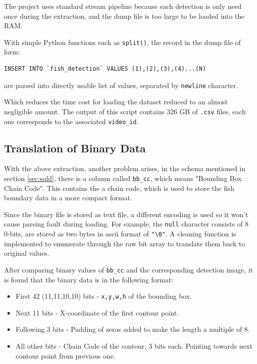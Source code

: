 \documentclass[bsc,logo,twoside,fullspacing,parskip]{infthesis}
\begin{document}
The project uses standard stream pipeline because each detection is only need once during the extraction, and the dump file is too large to be loaded into the RAM.

With simple Python functions such as {\tt split()}, the record in the dump file of form:
\lstset{basicstyle=\small\ttfamily,breaklines=true,style=sql}
\begin{lstlisting}[frame=single]
 INSERT INTO `fish_detection` VALUES (1),(2),(3),(4)...(N)
\end{lstlisting}
are parsed into directly usable list of values, separated by {\tt newline} character.

Which reduces the time cost for loading the dataset reduced to an almost negligible amount. 
The output of this script contains 326 GB of {\tt .csv} files, each one corresponds to the associated {\tt video\_id}.


\subsection{Translation of Binary Data} 

With the above extraction, another problem arises, in the schema mentioned in section \ref{sec:sqld}, there is a column called {\tt bb\_cc}, which means "Bounding Box Chain Code". 
This contains the  a chain code, which is used to store the fish boundary data in a more compact format.

Since the binary file is stored as text file, a different encoding is used so it won't cause parsing fault during loading.
For example, the {\tt null} character consists of 8 0-bits, are stored as two bytes in ascii format of {\tt "\textbackslash0"}. A cleaning function is implemented to enumerate through the raw bit array to translate them back to original values.

After comparing binary values of {\tt bb\_cc} and the corresponding detection image, it is found that the binary data is in the following format:
\begin{itemize}
\setlength{\parskip}{1pt}
\item
First 42 (11,11,10,10) bits - {\tt x,y,w,h} of the bounding box.
\item
Next 11 bits - X-coordinate of the first contour point.
\item
Following 3 bits - Padding of zeros added to make the length a multiple of 8.
\item
All other bits - Chain Code of the contour, 3 bits each. Pointing towards next contour point from previous one. 
\end{itemize}
\end{document}
